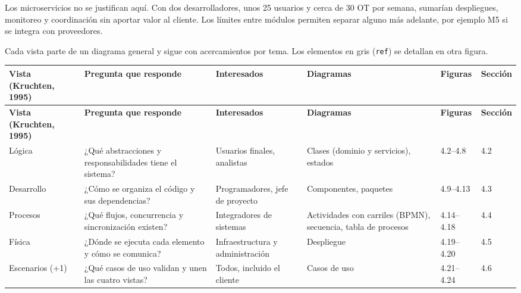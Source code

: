 \documentclass[11pt,a4paper]{article}
\begin{document}
Los microservicios no se justifican aquí. Con dos desarrolladores, unos 25 usuarios y cerca de 30 OT por semana, sumarían despliegues, monitoreo y coordinación sin aportar valor al cliente. Los límites entre módulos permiten separar alguno más adelante, por ejemplo M5 si se integra con proveedores.

Cada vista parte de un diagrama general y sigue con acercamientos por tema. Los elementos en gris (\texttt{\guillemotleft{}ref\guillemotright{}}) se detallan en otra figura.

\begingroup\footnotesize
\begin{longtable}{@{}>{\raggedright\arraybackslash\hspace{0pt}}p{}>{\raggedright\arraybackslash\hspace{0pt}}p{}>{\raggedright\arraybackslash\hspace{0pt}}p{}>{\raggedright\arraybackslash\hspace{0pt}}p{}>{\raggedright\arraybackslash\hspace{0pt}}p{}>{\raggedright\arraybackslash\hspace{0pt}}p{}@{}}
\toprule
\textbf{Vista (Kruchten, 1995)} & \textbf{Pregunta que responde} & \textbf{Interesados} & \textbf{Diagramas} & \textbf{Figuras} & \textbf{Sección} \\ \midrule
\endfirsthead
\toprule
\textbf{Vista (Kruchten, 1995)} & \textbf{Pregunta que responde} & \textbf{Interesados} & \textbf{Diagramas} & \textbf{Figuras} & \textbf{Sección} \\ \midrule
\endhead
\bottomrule
\endlastfoot
Lógica & ¿Qué abstracciones y responsabilidades tiene el sistema? & Usuarios finales, analistas & Clases (dominio y servicios), estados & \mbox{4.2--4.8} & \mbox{4.2} \\ \addlinespace[0.25em]
\mbox{Desarrollo} & ¿Cómo se organiza el código y sus dependencias? & Programadores, jefe de proyecto & Componentes, paquetes & \mbox{4.9--4.13} & \mbox{4.3} \\ \addlinespace[0.25em]
\mbox{Procesos} & ¿Qué flujos, concurrencia y sincronización existen? & Integradores de sistemas & Actividades con carriles (BPMN), secuencia, tabla de procesos & \mbox{4.14--4.18} & \mbox{4.4} \\ \addlinespace[0.25em]
Física & ¿Dónde se ejecuta cada elemento y cómo se comunica? & Infraestructura y administración & \mbox{Despliegue} & \mbox{4.19--4.20} & \mbox{4.5} \\ \addlinespace[0.25em]
Escenarios (+1) & ¿Qué casos de uso validan y unen las cuatro vistas? & Todos, incluido el cliente & Casos de uso & \mbox{4.21--4.24} & \mbox{4.6} \\
\end{longtable}
\endgroup
\end{document}
